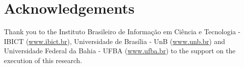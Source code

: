 \section*{Acknowledgements}

Thank you to the
Instituto Brasileiro de Informação em Ciência e Tecnologia - IBICT (\url{www.ibict.br}),
Universidade de Brasília - UnB (\url{www.unb.br})
and
Universidade Federal da Bahia - UFBA (\url{www.ufba.br})
to the support on the execution of this research.

